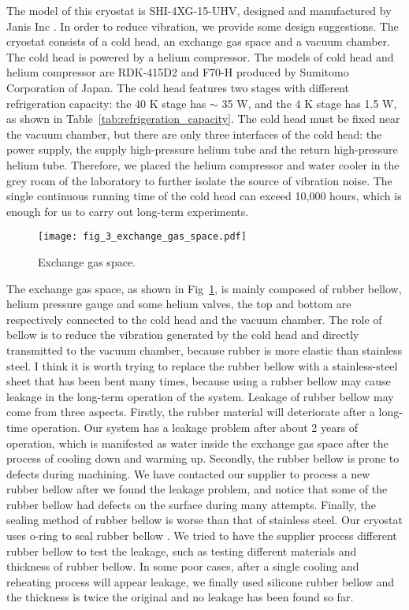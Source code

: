 The model of this cryostat is SHI-4XG-15-UHV, designed and manufactured by Janis Inc \cite{RN121}. In order to reduce vibration, we provide some design suggestions. The cryostat consists of a cold head, an exchange gas space and a vacuum chamber.
The cold head is powered by a helium compressor. The models of cold head and helium compressor are RDK-415D2 and F70-H produced by Sumitomo Corporation of Japan. The cold head features two stages with different refrigeration capacity: the 40 K stage has $\sim$ 35 W, and the 4 K stage has 1.5 W, as shown in Table~\ref{tab:refrigeration_capacity}. The cold head must be fixed near the vacuum chamber, but there are only three interfaces of the cold head: the power supply, the supply high-pressure helium tube and the return high-pressure helium tube. Therefore, we placed the helium compressor and water cooler in the grey room of the laboratory to further isolate the source of vibration noise. The single continuous running time of the cold head can exceed 10,000 hours, which is enough for us to carry out long-term experiments.

\begin{figure}
    \centering
    \texttt{[image: fig\_3\_exchange\_gas\_space.pdf]}
    \caption{Exchange gas space.}
    \label{fig:exchange_gas_space}
\end{figure}

The exchange gas space, as shown in Fig~\ref{fig:exchange_gas_space}, is mainly composed of rubber bellow, helium pressure gauge and some helium valves, the top and bottom are respectively connected to the cold head and the vacuum chamber. The role of bellow is to reduce the vibration generated by the cold head and directly transmitted to the vacuum chamber, because rubber is more elastic than stainless steel. I think it is worth trying to replace the rubber bellow with a stainless-steel sheet that has been bent many times, because using a rubber bellow may cause leakage in the long-term operation of the system. Leakage of rubber bellow may come from three aspects. Firstly, the rubber material will deteriorate after a long-time operation. Our system has a leakage problem after about 2 years of operation, which is manifested as water inside the exchange gas space after the process of cooling down and warming up. Secondly, the rubber bellow is prone to defects during machining. We have contacted our supplier to process a new rubber bellow after we found the leakage problem, and notice that some of the rubber bellow had defects on the surface during many attempts. Finally, the sealing method of rubber bellow is worse than that of stainless steel. Our cryostat uses o-ring to seal rubber bellow \cite{RN133}. We tried to have the supplier process different rubber bellow to test the leakage, such as testing different materials and thickness of rubber bellow. In some poor cases, after a single cooling and reheating process will appear leakage, we finally used silicone rubber bellow and the thickness is twice the original and no leakage has been found so far.



